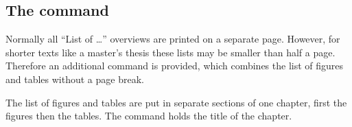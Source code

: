 \subsection[\cs{listoffiguresandtables}]{%
  The  command}
Normally all ``List of \ldots'' overviews are printed on a separate page.
However, for shorter texts like a master's thesis these lists may be smaller
than half a page. Therefore an additional command
 is provided, which combines the list of
figures and tables without a page break.

The list of figures and tables are put in separate sections of one chapter,
first the figures then the tables. The command
 holds the title of the chapter.


